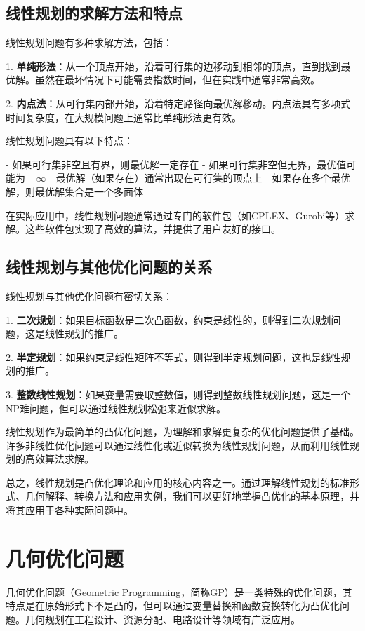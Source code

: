 \documentclass[12pt,a4paper]{book}
\begin{document}
\subsection{线性规划的求解方法和特点}

线性规划问题有多种求解方法，包括：

1. \textbf{单纯形法}：从一个顶点开始，沿着可行集的边移动到相邻的顶点，直到找到最优解。虽然在最坏情况下可能需要指数时间，但在实践中通常非常高效。

2. \textbf{内点法}：从可行集内部开始，沿着特定路径向最优解移动。内点法具有多项式时间复杂度，在大规模问题上通常比单纯形法更有效。

线性规划问题具有以下特点：

- 如果可行集非空且有界，则最优解一定存在
- 如果可行集非空但无界，最优值可能为 $-\infty$
- 最优解（如果存在）通常出现在可行集的顶点上
- 如果存在多个最优解，则最优解集合是一个多面体

在实际应用中，线性规划问题通常通过专门的软件包（如CPLEX、Gurobi等）求解。这些软件包实现了高效的算法，并提供了用户友好的接口。

\subsection{线性规划与其他优化问题的关系}

线性规划与其他优化问题有密切关系：

1. \textbf{二次规划}：如果目标函数是二次凸函数，约束是线性的，则得到二次规划问题，这是线性规划的推广。

2. \textbf{半定规划}：如果约束是线性矩阵不等式，则得到半定规划问题，这也是线性规划的推广。

3. \textbf{整数线性规划}：如果变量需要取整数值，则得到整数线性规划问题，这是一个NP难问题，但可以通过线性规划松弛来近似求解。

线性规划作为最简单的凸优化问题，为理解和求解更复杂的优化问题提供了基础。许多非线性优化问题可以通过线性化或近似转换为线性规划问题，从而利用线性规划的高效算法求解。

总之，线性规划是凸优化理论和应用的核心内容之一。通过理解线性规划的标准形式、几何解释、转换方法和应用实例，我们可以更好地掌握凸优化的基本原理，并将其应用于各种实际问题中。

\section{几何优化问题}

几何优化问题（Geometric Programming，简称GP）是一类特殊的优化问题，其特点是在原始形式下不是凸的，但可以通过变量替换和函数变换转化为凸优化问题。几何规划在工程设计、资源分配、电路设计等领域有广泛应用。
\end{document}
